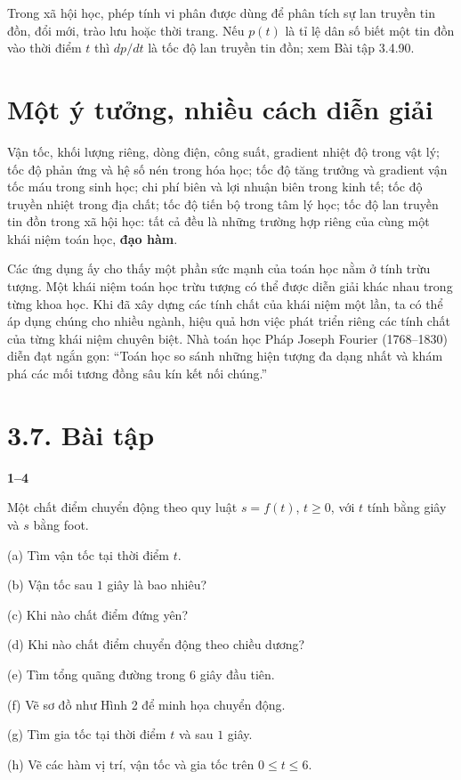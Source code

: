 \documentclass[12pt,a4paper]{article}
\newcommand{\group}[1]{\par\medskip\noindent\textbf{#1}\par\nopagebreak[4]}
\begin{document}
Trong xã hội học, phép tính vi phân được dùng để phân tích sự lan truyền tin đồn, đổi mới, trào lưu hoặc thời trang. Nếu $p(t)$ là tỉ lệ dân số biết một tin đồn vào thời điểm $t$ thì $dp/dt$ là tốc độ lan truyền tin đồn; xem Bài tập 3.4.90.
\section*{Một ý tưởng, nhiều cách diễn giải}
Vận tốc, khối lượng riêng, dòng điện, công suất, gradient nhiệt độ trong vật lý; tốc độ phản ứng và hệ số nén trong hóa học; tốc độ tăng trưởng và gradient vận tốc máu trong sinh học; chi phí biên và lợi nhuận biên trong kinh tế; tốc độ truyền nhiệt trong địa chất; tốc độ tiến bộ trong tâm lý học; tốc độ lan truyền tin đồn trong xã hội học: tất cả đều là những trường hợp riêng của cùng một khái niệm toán học, \textbf{đạo hàm}.

Các ứng dụng ấy cho thấy một phần sức mạnh của toán học nằm ở tính trừu tượng. Một khái niệm toán học trừu tượng có thể được diễn giải khác nhau trong từng khoa học. Khi đã xây dựng các tính chất của khái niệm một lần, ta có thể áp dụng chúng cho nhiều ngành, hiệu quả hơn việc phát triển riêng các tính chất của từng khái niệm chuyên biệt. Nhà toán học Pháp Joseph Fourier (1768–1830) diễn đạt ngắn gọn: “Toán học so sánh những hiện tượng đa dạng nhất và khám phá các mối tương đồng sâu kín kết nối chúng.”
\section*{3.7. Bài tập}
\group{1–4} Một chất điểm chuyển động theo quy luật $s=f(t)$, $t\ge0$, với $t$ tính bằng giây và $s$ bằng foot.

(a) Tìm vận tốc tại thời điểm $t$.

(b) Vận tốc sau $1$ giây là bao nhiêu?

(c) Khi nào chất điểm đứng yên?

(d) Khi nào chất điểm chuyển động theo chiều dương?

(e) Tìm tổng quãng đường trong $6$ giây đầu tiên.

(f) Vẽ sơ đồ như Hình 2 để minh họa chuyển động.

(g) Tìm gia tốc tại thời điểm $t$ và sau $1$ giây.

(h) Vẽ các hàm vị trí, vận tốc và gia tốc trên $0\le t\le6$.
\end{document}
